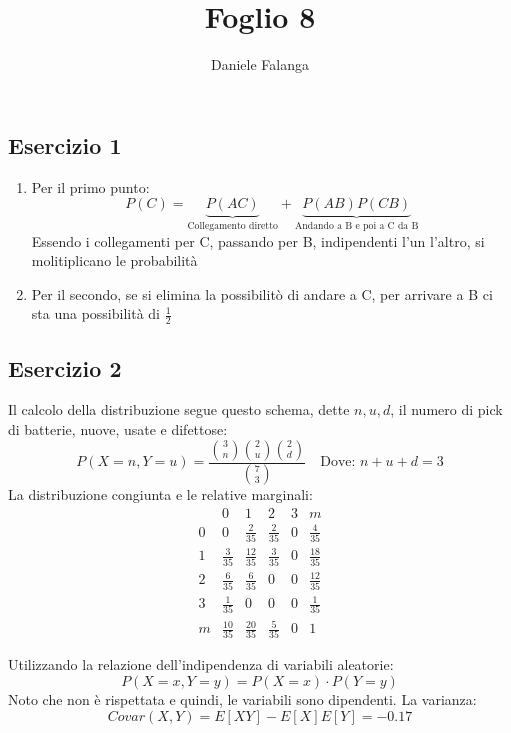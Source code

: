 \documentclass[12pt]{article}
\title{\textbf{Foglio 8}}
\author{Daniele Falanga}
\date{}
\begin{document}
\maketitle

\subsection*{Esercizio 1}

\begin{enumerate}
    \item Per il primo punto:
    \[
    P(C) = \underbrace{P(AC)}_{\text{Collegamento diretto}} + \underbrace{P(AB)P(CB)}_{\text{Andando a B e poi a C da B}}    
    \]
    Essendo i collegamenti per C, passando per B, indipendenti l'un l'altro, si molitiplicano le probabilità
    \item Per il secondo, se si elimina la possibilitò di andare a C, per arrivare a B ci sta una possibilità di \(\frac{1}{2}\)
\end{enumerate}

\newpage
\subsection*{Esercizio 2}
Il calcolo della distribuzione segue questo schema, dette \(n,u,d\), il numero di pick di batterie, nuove, usate e difettose:
\[
P(X=n,Y=u) = \frac{\binom{3}{n} \binom{2}{u} \binom{2}{d}}{\binom{7}{3}}    \quad \text{Dove: } n+u+d = 3
\]
La distribuzione congiunta e le relative marginali:
\begin{equation*}
    \renewcommand{\arraystretch}{1.5}
    \begin{array}{c|cccc|c}
          & 0 & 1 & 2 & 3 & m\\
    \hline
    0 & 0 & \frac{2}{35} & \frac{2}{35} & 0 & \frac{4}{35}\\
    1 & \frac{3}{35} & \frac{12}{35} & \frac{3}{35} & 0 & \frac{18}{35} \\
    2 & \frac{6}{35} & \frac{6}{35} & 0 & 0 & \frac{12}{35}\\ 
    3 & \frac{1}{35} & 0 & 0 & 0 & \frac{1}{35}\\
    \hline
    m & \frac{10}{35} & \frac{20}{35} & \frac{5}{35} & 0 & 1 
    \end{array}
\end{equation*}

Utilizzando la relazione dell'indipendenza di variabili aleatorie:
\[
P(X=x,Y=y) = P(X=x)\cdot P(Y=y)    
\]
Noto che non è rispettata e quindi, le variabili sono dipendenti.
La varianza:
\[
Covar(X,Y) = E[XY] - E[X]E[Y] = -0.17    
\] 
\end{document}
